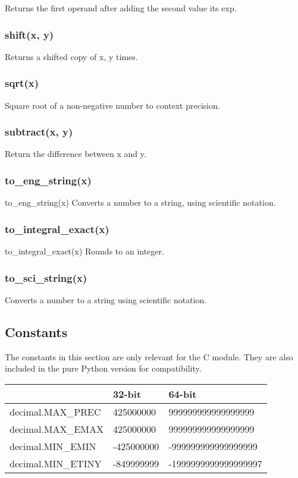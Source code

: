 Returns the first operand after adding the second value its exp.

\subsubsection{shift(x, y)}

Returns a shifted copy of x, y times.

\subsubsection{sqrt(x)}

Square root of a non-negative number to context precision.

\subsubsection{subtract(x, y)}

Return the difference between x and y.

\subsubsection{to\_eng\_string(x)}
to\_eng\_string(x)
Converts a number to a string, using scientific notation.

\subsubsection{to\_integral\_exact(x)}
to\_integral\_exact(x)
Rounds to an integer.

\subsubsection{to\_sci\_string(x)}

Converts a number to a string using scientific notation.




\subsection{Constants}

The constants in this section are only relevant for the C module. They are also included in the pure Python version for compatibility.


\begin{table}[ht]
	\centering
	\begin{tabular}{|l|l|l|}
		\hline
		 & 32-bit & 64-bit\\
		\hline
		decimal.MAX\_PREC & 425000000 & 999999999999999999  \\
		decimal.MAX\_EMAX & 425000000 &  999999999999999999 \\
		decimal.MIN\_EMIN & -425000000 & -999999999999999999  \\				
		decimal.MIN\_ETINY & -849999999 & -1999999999999999997  \\			
		\hline
	\end{tabular}
\end{table}



